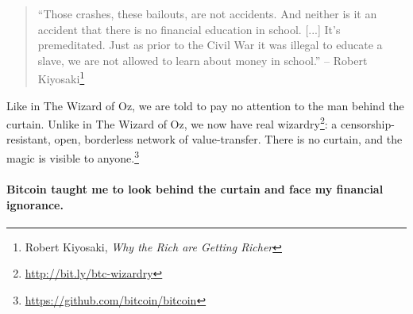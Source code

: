\begin{samepage}\begin{quotation}
\enquote{Those crashes, these bailouts, are not accidents. And neither is it an
accident that there is no financial education in school. [...] It's
premeditated. Just as prior to the Civil War it was illegal to educate a slave,
we are not allowed to learn about money in school.}
\flushright -- Robert Kiyosaki\footnote{Robert Kiyosaki, \textit{Why the Rich
are Getting Richer}\cite{robert-kiyosaki}}
\end{quotation}\end{samepage}

Like in The Wizard of Oz, we are told to pay no attention to the man behind the
curtain. Unlike in The Wizard of Oz, we now have real
wizardry\footnote{\url{http://bit.ly/btc-wizardry}}: a censorship-resistant,
open, borderless network of value-transfer. There is no curtain, and the magic
is visible to anyone.\footnote{\url{https://github.com/bitcoin/bitcoin}}

\paragraph{Bitcoin taught me to look behind the curtain and face my financial
ignorance.}

%
%
%
%
